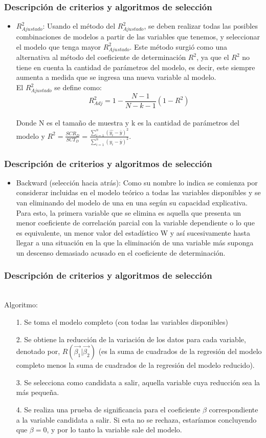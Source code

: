 \documentclass[12pt]{beamer}
\begin{document}
\begin{frame}
\frametitle{Descripción de criterios y algoritmos de selección}
\begin{itemize}
\item $R^2_{Ajustado}$: Usando el método del $R^2_{Ajustado}$, se deben realizar todas las posibles combinaciones de modelos a partir de las variables que tenemos, y seleccionar el modelo que tenga mayor $R^2_{Ajustado}$. Este método surgió como una alternativa al método del coeficiente de determinación $R^2$, ya que el $R^2$ no tiene en cuenta la cantidad de parámetros del modelo, es decir, este siempre aumenta a medida que se ingresa una nueva variable al modelo.
~\\El $R^2_{Ajustado}$ se define como:
$$R^2_{Adj}=1-\frac{N-1}{N-k-1}(1-R^2)$$ 
~\\Donde N es el tamaño de muestra y k es la cantidad de parámetros del modelo y $R^2=\frac{SCR_{D}}{SCT_{D}}=\frac{\sum\limits_{i=1}^{n}(\hat{y_{i}}-\bar{y})^2}{\sum\limits_{i=1}^{n}(y_{i}-\bar{y})^2}$.
\end{itemize}
\end{frame}

\begin{frame}
\frametitle{Descripción de criterios y algoritmos de selección}
\begin{itemize}
\item Backward (selección hacia atrás): Como su nombre lo indica se comienza por considerar incluidas en el modelo teórico a todas las variables disponibles y se van eliminando del modelo de una en una según su capacidad explicativa. Para esto,  la primera variable que se elimina es aquella que presenta un menor coeficiente de correlación parcial  con la variable dependiente o lo que es equivalente, un menor valor del estadístico W y así sucesivamente hasta llegar a una situación en la que la eliminación de una variable más suponga un descenso demasiado acusado en el coeficiente de determinación.
\end{itemize}
\end{frame}

\begin{frame}
\frametitle{Descripción de criterios y algoritmos de selección}
~\\Algoritmo:
\begin{itemize}
\item[1.] Se toma el modelo completo (con todas las variables disponibles)
\item[2.] Se obtiene la reducción de la variación de los datos para cada variable, denotado por, $R(\vec{\beta_{1}}|\vec{\beta_{2}})$ (es la suma de cuadrados de la regresión del modelo completo menos la suma de cuadrados de la regresión del modelo reducido).
\item[3.] Se selecciona como candidata a salir, aquella variable cuya reducción sea la más pequeña.
\item[4.] Se realiza una prueba de significancia para el coeficiente $\beta$ correspondiente a la variable candidata a salir. Si esta no se rechaza, estaríamos concluyendo que $\beta=0$, y por lo tanto la variable sale del modelo.
\end{itemize}
\end{frame}
\end{document}
